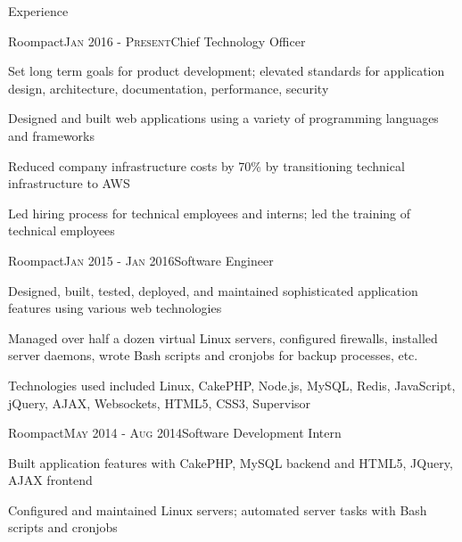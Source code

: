 \documentclass{resume} %
\begin{document}

\begin{rSection}{Experience}
\begin{rSubsection}{Roompact}{\textsc{Jan 2016 - Present}}{Chief Technology Officer}{}
\item Set long term goals for product development; elevated standards for application design, architecture, documentation, performance, security
\item Designed and built web applications using a variety of programming languages and frameworks
\item Reduced company infrastructure costs by 70\% by transitioning technical infrastructure to AWS
\item Led hiring process for technical employees and interns; led the training of technical employees
\end{rSubsection}


\begin{rSubsection}{Roompact}{\textsc{Jan 2015 - Jan 2016}}{Software Engineer}{}
\item Designed, built, tested, deployed, and maintained sophisticated application features using various web technologies
\item Managed over half a dozen virtual Linux servers, configured firewalls, installed server daemons, wrote Bash scripts and cronjobs for backup processes, etc.
\item Technologies used included Linux, CakePHP, Node.js, MySQL, Redis, JavaScript, jQuery, AJAX, Websockets, HTML5, CSS3, Supervisor
\end{rSubsection}


\begin{rSubsection}{Roompact}{\textsc{May 2014 - Aug 2014}}{Software Development Intern}{}
\item Built application features with CakePHP, MySQL backend and HTML5, JQuery, AJAX frontend
\item Configured and maintained Linux servers; automated server tasks with Bash scripts and cronjobs
\end{rSubsection}



\end{rSection}
\end{document}

